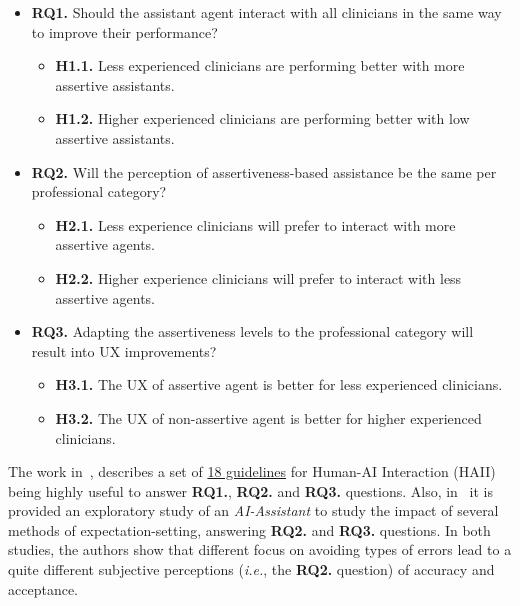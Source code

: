 \begin{itemize}
\item {\bf RQ1.} Should the assistant agent interact with all clinicians in the same way to improve their performance?
\begin{itemize}
\item {\bf H1.1.} Less experienced clinicians are performing better with more assertive assistants.
\item {\bf H1.2.} Higher experienced clinicians are performing better with low assertive assistants.
\end{itemize}
\item {\bf RQ2.} Will the perception of assertiveness-based assistance be the same per professional category?
\begin{itemize}
\item {\bf H2.1.} Less experience clinicians will prefer to interact with more assertive agents.
\item {\bf H2.2.} Higher experience clinicians will prefer to interact with less assertive agents.
\end{itemize}
\item {\bf RQ3.} Adapting the assertiveness levels to the professional category will result into UX improvements?
\begin{itemize}
\item {\bf H3.1.} The UX of assertive agent is better for less experienced clinicians.
\item {\bf H3.2.} The UX of non-assertive agent is better for higher experienced clinicians.
\end{itemize}
\end{itemize}

The work in~\cite{10.1145/3290605.3300233}, describes a set of \underline{18 guidelines} for Human-AI Interaction (HAII) being highly useful to answer {\bf RQ1.}, {\bf RQ2.} and {\bf RQ3.} questions.
Also, in~\cite{Kocielnik:2019:YAI:3290605.3300641} it is provided  an exploratory study of an {\it AI-Assistant} to study the impact of several methods of expectation-setting, answering {\bf RQ2.} and {\bf RQ3.} questions.
In both studies, the authors show that different focus on avoiding types of errors lead to a quite different subjective perceptions ({\it i.e.}, the {\bf RQ2.} question) of accuracy and acceptance.

\break